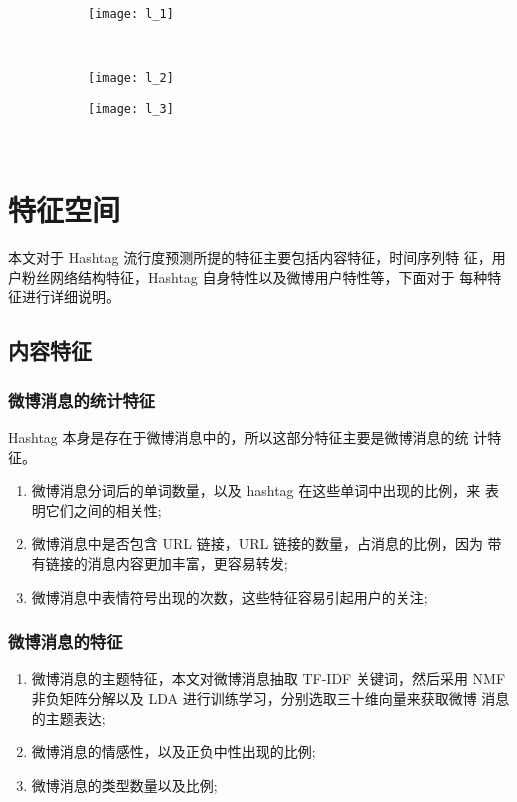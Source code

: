 \begin{figure}[!htbp]
    \centering
    \begin{subfigure}[b]{0.5\textwidth}
      \texttt{[image: l\_1]}
      \caption{}
      \label{fig:oaspl_a}
    \end{subfigure}%
    ~%
    \begin{subfigure}[b]{0.5\textwidth}
      \texttt{[image: l\_2]}
      \caption{}
      \label{fig:oaspl_b}
    \end{subfigure}
    \begin{subfigure}[b]{1\textwidth}
      \texttt{[image: l\_3]}
      \caption{}
      \label{fig:oaspl_c}
    \end{subfigure}%
    ~%
    \label{fig:lixiaolu}
\end{figure}

\section{特征空间}
本文对于 Hashtag 流行度预测所提的特征主要包括内容特征，时间序列特 征，用户粉丝网络结构特征，Hashtag 自身特性以及微博用户特性等，下面对于 每种特征进行详细说明。

\subsection{内容特征}

\subsubsection{微博消息的统计特征}
Hashtag 本身是存在于微博消息中的，所以这部分特征主要是微博消息的统 计特征。
\begin{enumerate}
\item 微博消息分词后的单词数量，以及 hashtag 在这些单词中出现的比例，来 表明它们之间的相关性;
\item 微博消息中是否包含 URL 链接，URL 链接的数量，占消息的比例，因为 带有链接的消息内容更加丰富，更容易转发;
\item 微博消息中表情符号出现的次数，这些特征容易引起用户的关注;
\end{enumerate}

\subsubsection{微博消息的特征}
\begin{enumerate}
\item 微博消息的主题特征，本文对微博消息抽取 TF-IDF 关键词，然后采用 NMF 非负矩阵分解以及 LDA 进行训练学习，分别选取三十维向量来获取微博 消息的主题表达;
\item 微博消息的情感性，以及正负中性出现的比例;
\item 微博消息的类型数量以及比例;
\end{enumerate}


